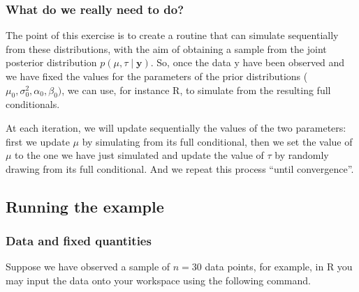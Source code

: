 \documentclass[
]{article}
\begin{document}
\hypertarget{what-do-we-really-need-to-do}{%
\subsubsection{What do we really need to
do?}\label{what-do-we-really-need-to-do}}

The point of this exercise is to create a routine that can simulate
sequentially from these distributions, with the aim of obtaining a
sample from the joint posterior distribution
\(p(\mu, \tau \mid \boldsymbol{y})\). So, once the data y have been
observed and we have fixed the values for the parameters of the prior
distributions (\(\mu_0, \sigma_0^2,\alpha_0,\beta_0)\), we can use, for
instance R, to simulate from the resulting full conditionals.

At each iteration, we will update sequentially the values of the two
parameters: first we update \(\mu\) by simulating from its full
conditional, then we set the value of \(\mu\) to the one we have just
simulated and update the value of \(\tau\) by randomly drawing from its
full conditional. And we repeat this process ``until convergence''.

\hypertarget{running-the-example}{%
\subsection{Running the example}\label{running-the-example}}

\hypertarget{data-and-fixed-quantities}{%
\subsubsection{Data and fixed
quantities}\label{data-and-fixed-quantities}}

Suppose we have observed a sample of \(n = 30\) data points, for
example, in R you may input the data onto your workspace using the
following command.
\end{document}
